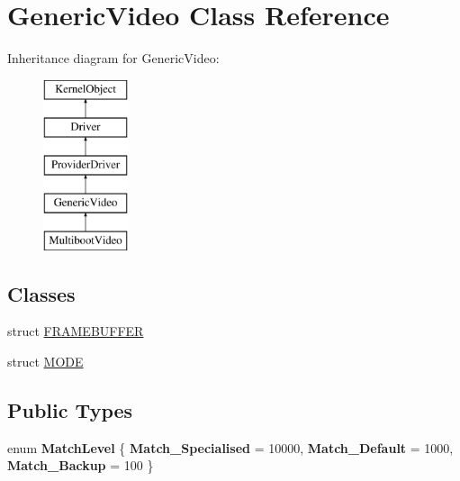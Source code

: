 \hypertarget{class_generic_video}{}\section{Generic\+Video Class Reference}
\label{class_generic_video}
Inheritance diagram for Generic\+Video\+:\begin{figure}[H]
\begin{center}
\leavevmode
\includegraphics[height=5.000000cm]{class_generic_video}
\end{center}
\end{figure}
\subsection*{Classes}
\begin{DoxyCompactItemize}
\item 
struct \hyperlink{struct_generic_video_1_1_f_r_a_m_e_b_u_f_f_e_r}{F\+R\+A\+M\+E\+B\+U\+F\+F\+ER}
\item 
struct \hyperlink{struct_generic_video_1_1_m_o_d_e}{M\+O\+DE}
\end{DoxyCompactItemize}
\subsection*{Public Types}
\begin{DoxyCompactItemize}
\item 
\mbox{\label{class_generic_video_a4c7668d1982087fd88cc45c1265d1016}} 
enum {\bfseries Match\+Level} \{ {\bfseries Match\+\_\+\+Specialised} = 10000, 
{\bfseries Match\+\_\+\+Default} = 1000, 
{\bfseries Match\+\_\+\+Backup} = 100
 \}
\end{DoxyCompactItemize}
